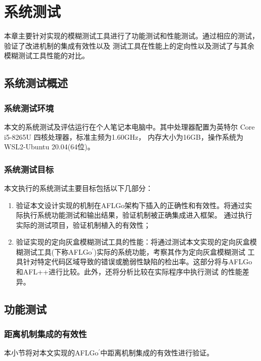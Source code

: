 \documentclass[bachelor]{njupthesis}
\begin{document}
\chapter{系统测试}
本章主要针对实现的模糊测试工具进行了功能测试和性能测试。通过相应的测试，验证了改进机制的集成有效性以及
测试工具在性能上的定向性以及测试了与其余模糊测试工具性能的对比。
\section{系统测试概述}
\subsection{系统测试环境}
本文的系统测试及评估运行在个人笔记本电脑中。其中处理器配置为英特尔 Core i5-8265U 四核处理器，标准主频为1.60GHz，
内存大小为16GB，操作系统为WSL2-Ubuntu 20.04(64位)。

\subsection{系统测试目标}
本文执行的系统测试主要目标包括以下几部分：
\begin{enumerate}[label=(\arabic*),leftmargin=48pt]
	\item 验证本文设计实现的机制在AFLGo架构下插入的正确性和有效性。将通过实际执行系统功能测试和输出结果，验证机制被正确集成进入框架。
	通过执行实际的测试项目，验证机制植入的有效性；
	\item 验证实现的定向灰盒模糊测试工具的性能：将通过测试本文实现的定向灰盒模糊测试工具(下称AFLGo$^\prime$)实际的系统功能，考察其作为定向灰盒模糊测试
	工具针对特定代码区域导致的错误或脆弱性缺陷的检出率。这部分将与AFLGo和AFL++\cite{aflpp}进行比较。此外，还将分析比较在实际程序中执行测试
	的性能差异。
\end{enumerate}

\section{功能测试}
\subsection{距离机制集成的有效性}
本小节将对本文实现的AFLGo$^\prime$中距离机制集成的有效性进行验证。
\end{document}
